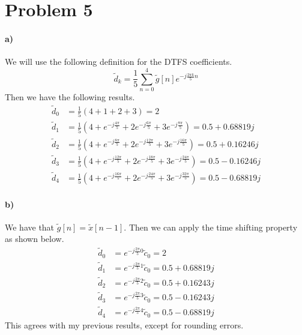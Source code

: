 \documentclass[12pt]{article}
\begin{document}
\section*{Problem 5}

\paragraph{a)}

We will use the following definition for the DTFS coefficients.
\[\tilde{d}_k=\frac{1}{5}\sum_{n=0}^{4}\tilde{g}[n] e^{-j\frac{2\pi k}{5}n}\]
Then we have the following results.
\begin{align*}
    \tilde{d}_0&=\frac{1}{5}(4+1+2+3)=2\\
    \tilde{d}_1&=\frac{1}{5}\left(4+e^{-j\frac{4\pi}{5}}+2e^{-j\frac{6\pi}{5}}+3e^{-j\frac{8\pi}{5}}\right)=0.5+0.68819j\\
    \tilde{d}_2&=\frac{1}{5}\left(4+e^{-j\frac{8\pi}{5}}+2e^{-j\frac{12\pi}{5}}+3e^{-j\frac{16\pi}{5}}\right)=0.5+0.16246j\\
    \tilde{d}_3&=\frac{1}{5}\left(4+e^{-j\frac{12\pi}{5}}+2e^{-j\frac{18\pi}{5}}+3e^{-j\frac{24\pi}{5}}\right)=0.5-0.16246j\\
    \tilde{d}_4&=\frac{1}{5}\left(4+e^{-j\frac{16\pi}{5}}+2e^{-j\frac{24\pi}{5}}+3e^{-j\frac{32\pi}{5}}\right)=0.5-0.68819j
\end{align*}

\paragraph{b)}

We have that \(\tilde{g}[n]=\tilde{x}[n-1]\). Then we can apply the time shifting property as shown below.
\begin{align*}
    \tilde{d}_0&=e^{-j\frac{2\pi}{5}0}\tilde{c}_0=2\\
    \tilde{d}_1&=e^{-j\frac{2\pi}{5}1}\tilde{c}_0=0.5+0.68819j\\
    \tilde{d}_2&=e^{-j\frac{2\pi}{5}2}\tilde{c}_0=0.5+0.16243j\\
    \tilde{d}_3&=e^{-j\frac{2\pi}{5}3}\tilde{c}_0=0.5-0.16243j\\
    \tilde{d}_4&=e^{-j\frac{2\pi}{5}4}\tilde{c}_0=0.5-0.68819j
\end{align*}
This agrees with my previous results, except for rounding errors.
\end{document}
